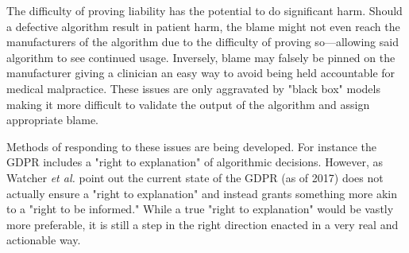 \documentclass[]{article}
\begin{document}
				The difficulty of proving liability has the potential to do significant harm. Should a defective algorithm result in patient harm, the blame might not even reach the manufacturers of the algorithm due to the difficulty of proving so---allowing said algorithm to see continued usage. Inversely, blame may falsely be pinned on the manufacturer giving a clinician an easy way to avoid being held accountable for medical malpractice. These issues are only aggravated by "black box" models making it more difficult to validate the output of the algorithm and assign appropriate blame.

				Methods of responding to these issues are being developed. For instance the GDPR includes a "right to explanation" of algorithmic decisions.\cite{goodman2017european} However, as Watcher \emph{et al.} point out the current state of the GDPR (as of 2017) does not actually ensure a "right to explanation" and instead grants something more akin to a "right to be informed."\cite{wachter2017right} While a true "right to explanation" would be vastly more preferable, it is still a step in the right direction enacted in a very real and actionable way.


		
		
\end{document}
